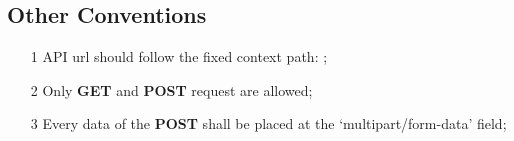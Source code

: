 {  \subsection*{Other Conventions}

  \begin{itemize}
	  \item[1] API url should follow the fixed context path: ;
	  \item[2] Only \textbf{GET} and \textbf{POST} request are allowed;
	  \item[3] Every data of the \textbf{POST} shall be placed at the \textquoteleft multipart/form-data' field;
  \end{itemize}
 }

